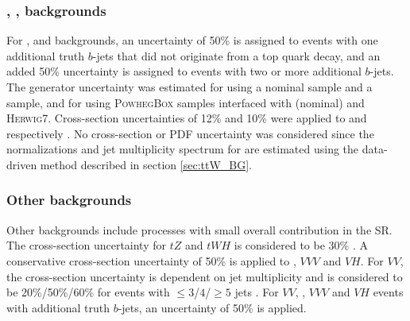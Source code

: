 \documentclass[../thesis.tex]{subfiles}
\begin{document}
\subsubsection*{\ttW, \ttZ, \ttH backgrounds}
For \ttW, \ttZ and \ttH backgrounds, an uncertainty of 50\% is assigned to events with one additional truth $b$-jets that did not originate from a top quark decay, and an added 50\% uncertainty is assigned to events with two or more \citep{TOPQ-2017-12} additional $b$-jets. The generator uncertainty was estimated for \ttZ using a \mgamc nominal sample and a \sherpa sample, and for \ttH using \textsc{PowhegBox} samples interfaced with \pythia (nominal) and \textsc{Herwig7}. Cross-section uncertainties of 12\% and 10\% were applied to \ttZ and \ttH respectively \citep{deFlorian:2016spz}. No \ttW cross-section or \acs{PDF} uncertainty was considered since the normalizations and jet multiplicity spectrum for \ttW are estimated using the data-driven method described in section \ref{sec:ttW_BG}.

\subsubsection*{Other backgrounds}
Other backgrounds include processes with small overall contribution in the \acs{SR}. The cross-section uncertainty for $tZ$ and $tWH$ is considered to be 30\% \citep{ATLAS-CONF-2017-052,Demartin_2017}. A conservative cross-section uncertainty of 50\% is applied to \ttVV, $VVV$ and $VH$. For $VV$, the cross-section uncertainty is dependent on jet multiplicity and is considered to be 20\%/50\%/60\% for events with $\leq 3$/$4$/$\geq 5$ jets \citep{STDM-2018-03}. For $VV$, \ttVV, $VVV$ and $VH$ events with additional truth $b$-jets, an uncertainty of 50\% is applied.
\end{document}
